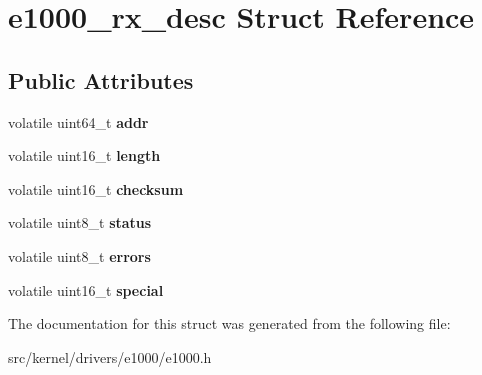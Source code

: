 \hypertarget{structe1000__rx__desc}{}\section{e1000\+\_\+rx\+\_\+desc Struct Reference}
\label{structe1000__rx__desc}
\subsection*{Public Attributes}
\begin{DoxyCompactItemize}
\item 
\mbox{\label{structe1000__rx__desc_aaa061e0b87bc89705effad8ef462b53d}} 
volatile uint64\+\_\+t {\bfseries addr}
\item 
\mbox{\label{structe1000__rx__desc_a687008bc02ec836a5c6c63bf44e45410}} 
volatile uint16\+\_\+t {\bfseries length}
\item 
\mbox{\label{structe1000__rx__desc_a704cdde2d72b6d60adfaedc351f308ab}} 
volatile uint16\+\_\+t {\bfseries checksum}
\item 
\mbox{\label{structe1000__rx__desc_aa08718ab5fc6c3bc8342fb0bb9b58b84}} 
volatile uint8\+\_\+t {\bfseries status}
\item 
\mbox{\label{structe1000__rx__desc_a6ea4a9d2cc7d22f404dee7421fe9e8f8}} 
volatile uint8\+\_\+t {\bfseries errors}
\item 
\mbox{\label{structe1000__rx__desc_a9deebab11ead743f84b960c21b1e3797}} 
volatile uint16\+\_\+t {\bfseries special}
\end{DoxyCompactItemize}


The documentation for this struct was generated from the following file\+:\begin{DoxyCompactItemize}
\item 
src/kernel/drivers/e1000/e1000.\+h\end{DoxyCompactItemize}
